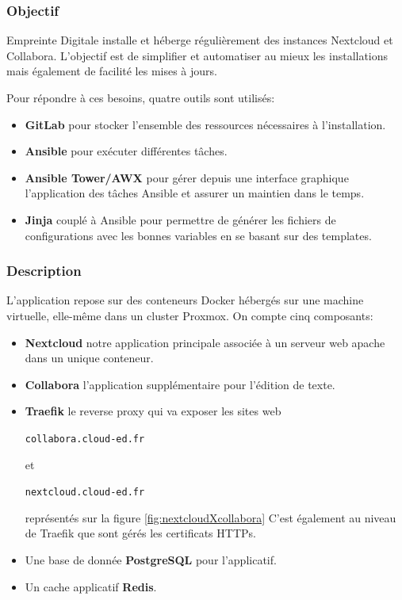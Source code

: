 \documentclass[12pt]{article}
\begin{document}
\subsubsection{Objectif}
Empreinte Digitale installe et héberge régulièrement des instances \gls{Nextcloud} et \gls{Collabora}. 
L'objectif est de simplifier et automatiser au mieux les installations mais également de facilité les mises à jours.

Pour répondre à ces besoins, quatre outils sont utilisés:
\begin{itemize}
    \item \textbf{\gls{GitLab}} pour stocker l'ensemble des ressources nécessaires à l'installation.
    \item \textbf{\gls{Ansible}} pour exécuter différentes tâches.
    \item \textbf{\gls{Ansible} Tower/AWX} pour gérer depuis une interface graphique l'application des tâches \gls{Ansible} et assurer un maintien dans le temps.
    \item \textbf{\gls{Jinja}} couplé à \gls{Ansible} pour permettre de générer les fichiers de configurations avec les bonnes variables en se basant sur des templates.
\end{itemize}

\subsubsection{Description}
L'application repose sur des conteneurs Docker hébergés sur une machine virtuelle, elle-même dans un \gls{cluster} \gls{Proxmox}. On compte cinq composants:
\begin{itemize}
    \item \textbf{\gls{Nextcloud}} notre application principale associée à un serveur web apache dans un unique conteneur.
    \item \textbf{\gls{Collabora}} l'application supplémentaire pour l'édition de texte.
    \item \textbf{\gls{Traefik}} le reverse proxy qui va exposer les sites web \begin{code}\texttt{collabora.cloud-ed.fr}\end{code} et \begin{code}\texttt{nextcloud.cloud-ed.fr}\end{code} représentés sur la figure \ref{fig:nextcloudXcollabora}
    C'est également au niveau de \gls{Traefik} que sont gérés les certificats HTTPs.
    \item Une base de donnée \textbf{PostgreSQL} pour l'applicatif.
    \item Un cache applicatif \textbf{Redis}.
\end{itemize}
\end{document}
